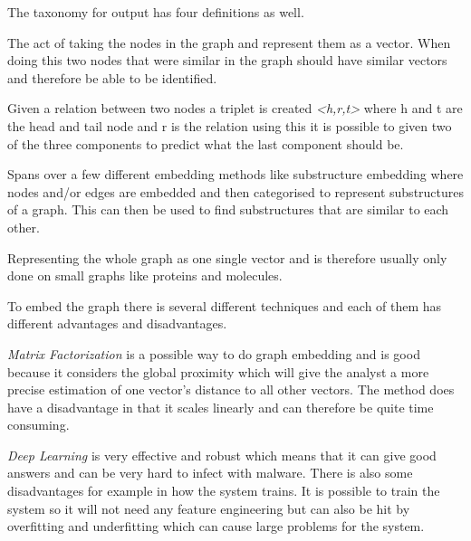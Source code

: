 The taxonomy for output has four definitions as well.

\begin{definition} The act of taking the nodes in the graph and represent them as a vector. When doing this two nodes that were similar in the graph should have similar vectors and therefore be able to be identified\cite{8294302}.
\end{definition}

\begin{definition} Given a relation between two nodes a triplet is created \textit{<h,r,t>}  where h and t are the head and tail node and r is the relation using this it is possible to given two of the three components to predict what the last component should be\cite{8294302}.
\end{definition}

\begin{definition} Spans over a few different embedding methods like substructure embedding where nodes and/or edges are embedded and then categorised to represent substructures of a graph. This can then be used to find substructures that are similar to each other\cite{8294302}.
\end{definition}

\begin{definition} Representing the whole graph as one single vector and is therefore usually only done on small graphs like proteins and molecules\cite{8294302}. 
\end{definition}

To embed the graph there is several different techniques and each of them has different advantages and disadvantages.

\textit{Matrix Factorization} is a possible way to do graph embedding and is good because it considers the global proximity which will give the analyst a more precise estimation of one vector's distance to all other vectors. The method does have a disadvantage in that it scales linearly and can therefore be quite time consuming\cite{8294302}.

\textit{Deep Learning} is very effective and robust which means that it can give good answers and can be very hard to infect with malware. There is also some disadvantages for example in how the system trains. It is possible to train the system so it will not need any feature engineering but can also be hit by overfitting and underfitting which can cause large problems for the system\cite{8294302}.


